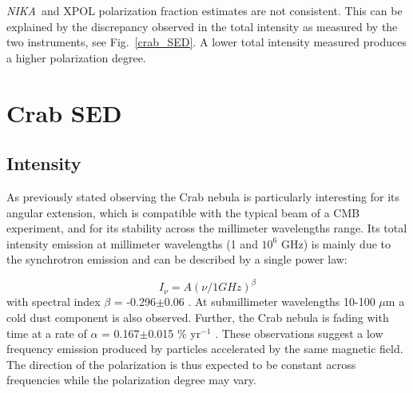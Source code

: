 \documentclass[twocolumn,traditabstract]{aa}
\def\NIKA{\textit{NIKA}}
\def\Planck{\textit{Planck}}
\def\WMAP{\textit{WMAP}}
\begin{document}

\NIKA\ and XPOL polarization fraction estimates are not consistent. This can be explained by the discrepancy observed in the total intensity as measured by the two instruments, see Fig.~\ref{crab_SED}. A lower total intensity measured produces a higher polarization degree. 


\section{Crab SED}\label{sec:Polarization intensity Spectral Energy Density (SED)}
\subsection{Intensity}
As previously stated observing the Crab nebula is particularly interesting for its angular extension, which is compatible with the typical beam of a CMB experiment, and for its stability across the millimeter wavelengths range. 
Its total intensity emission at millimeter wavelengths (1 and $10^6$ GHz) is mainly due to the synchrotron emission and can be described by a single power law:

\begin{equation}
I_{\nu} = A(\nu / 1 GHz)^{\beta}
\end{equation}\label{eq:sync}
 with spectral index $\beta$ = -0.296$\pm$0.06 \citep{baars1977absolute,macias2010}. At submillimeter wavelengths 10-100 $\mu$m a cold dust component is also observed. Further, the Crab nebula is fading with time at a rate of $\alpha$ = 0.167$\pm$0.015 \% yr$^{-1}$ \citep{aller1985decrease}. 
These observations suggest a low frequency emission produced by particles accelerated by the same magnetic field. The direction of the polarization is thus expected to be constant across frequencies while the polarization degree may vary. 
\end{document}
